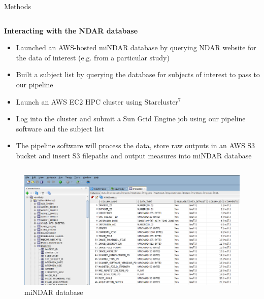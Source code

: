 \documentclass[final,hyperref={pdfpagelabels=false}]{beamer}
\begin{document}
\begin{frame}
\begin{columns}
\begin{column}{.5\textwidth}
{\begin{block}{Methods}
            \begin{column}{.47\textwidth}
            {\bf Interacting with the NDAR database}
                \begin{itemize}
                    \item Launched an AWS-hosted miNDAR database by querying NDAR website for the data of interest (e.g. from a particular study)
                    \item Built a subject list by querying the database for subjects of interest to pass to our pipeline
                    \item Launch an AWS EC2 HPC cluster using Starcluster$^{7}$
                    \item Log into the cluster and submit a Sun Grid Engine job using our pipeline software and the subject list
                    \item The pipeline software will process the data, store raw outputs in an AWS S3 bucket and insert S3 filepaths and output measures into miNDAR database
                \end{itemize}
            \end{column}
            \begin{column}{.47\textwidth}
                \begin{figure}
                    \begin{center}
                        \includegraphics[width=.9\textwidth]{mindar.png}
                    \end{center}
                    \caption{\label{fig:mindar}miNDAR database}
                \end{figure}
            \end{column}
        \vfill
        \end{block}
          }

\end{column}
\end{columns}
\end{frame}
\end{document}
